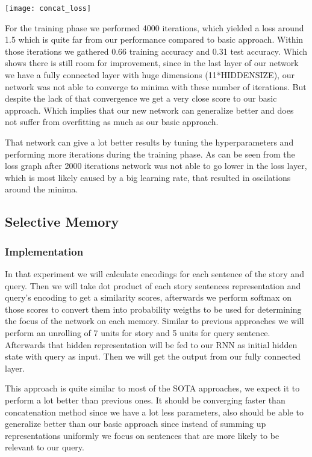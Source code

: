 \documentclass[conference,compsoc]{IEEEtran}
\begin{document}
\texttt{[image: concat\_loss]}

For the training phase we performed 4000 iterations, which yielded a loss around 1.5
which is quite far from our performance compared to basic approach. 
Within those iterations we gathered 0.66 training accuracy and 0.31 test accuracy.
Which shows there is still room for improvement, since in the last layer of our network
we have a fully connected layer with huge dimensions (11*HIDDENSIZE), our network was not
able to converge to minima with these number of iterations. But despite the lack of that
convergence we get a very close score to our basic approach. Which implies that our new
network can generalize better and does not suffer from overfitting as much as our basic
approach.

That network can give a lot better results by tuning the hyperparameters and performing
more iterations during the training phase. As can be seen from the loss graph after 2000
iterations network was not able to go lower in the loss layer, which is most likely caused
by a big learning rate, that resulted in oscilations around the minima.

\subsection{Selective Memory}
\subsubsection{Implementation}
In that experiment we will calculate encodings for each sentence of the story
and query. Then we will take dot product of each story sentences representation
and query's encoding to get a similarity scores, afterwards we perform softmax on those
scores to convert them into probability weigths to be used for determining the focus
of the network on each memory. Similar to previous approaches we will perform an
unrolling of 7 units for story and 5 units for query sentence. Afterwards that
hidden representation will be fed to our RNN as initial hidden state with query
as input. Then we will get the output from our fully connected layer.

This approach is quite similar to most of the SOTA approaches, we expect it to perform
a lot better than previous ones. It should be converging faster than concatenation
method since we have a lot less parameters, also should be able to generalize better
than our basic approach since instead of summing up representations uniformly we focus
on sentences that are more likely to be relevant to our query.
\end{document}
